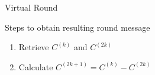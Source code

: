 \begin{frame}{Virtual Round}
    \begin{block}{Steps to obtain resulting round message}
        \begin{enumerate}
            \item Retrieve $C^{(k)}$ and $C^{(2k)}$
            \item Calculate $C^{(2k+1)} = C^{(k)} - C^{(2k)}$
        \end{enumerate}
    \end{block}
\end{frame}